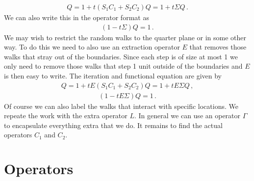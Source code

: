 \begin{align}
	Q = 1 + t(S_1 C_1 + S_2 C_2)Q = 1 + t\Sigma Q\,.
\end{align}
We can also write this in the operator format as
\begin{align}
	(1-t\Sigma) Q = 1\,.
\end{align}
We may wish to restrict the random walks to the quarter plane or in some other way. To do this we need to also use an extraction operator $E$ that removes those walks that stray out of the boundaries. Since each step is of size at most 1 we only need to remove those walks that step 1 unit outside of the boundaries and $E$ is then easy to write. The iteration and functional equation are given by
\begin{align}
	Q = 1 + tE(S_1 C_1 + S_2 C_2)Q = 1 + tE\Sigma Q\,,
\end{align}
\begin{align}
	(1-tE\Sigma)Q = 1\,.
\end{align}
Of course we can also label the walks that interact with specific locations. We repeate the work with the extra operator $L$. In general we can use an operator $\Gamma$ to encapsulate everything extra that we do. It remains to find the actual operators $C_1$ and $C_2$.

\section{Operators}

